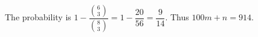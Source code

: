 The probability is $1-\dfrac{\binom63}{\binom83}=1-\dfrac{20}{56}=\dfrac{9}{14}$. Thus $\boxed{100m+n=914}$.
